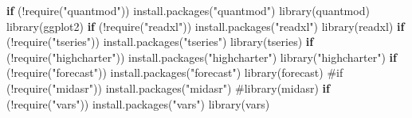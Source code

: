 \documentclass[
  polish,
  letterpaper,
  DIV=11,
  numbers=noendperiod]{scrartcl}
\newenvironment{Shaded}{\begin{snugshade}}{\end{snugshade}}
\newcommand{\CommentTok}[1]{\textcolor[rgb]{0.37,0.37,0.37}{#1}}
\newcommand{\ControlFlowTok}[1]{\textcolor[rgb]{0.00,0.23,0.31}{\textbf{#1}}}
\newcommand{\FunctionTok}[1]{\textcolor[rgb]{0.28,0.35,0.67}{#1}}
\newcommand{\NormalTok}[1]{\textcolor[rgb]{0.00,0.23,0.31}{#1}}
\newcommand{\SpecialCharTok}[1]{\textcolor[rgb]{0.37,0.37,0.37}{#1}}
\newcommand{\StringTok}[1]{\textcolor[rgb]{0.13,0.47,0.30}{#1}}
\begin{document}
\begin{Shaded}
\begin{Highlighting}[]
\ControlFlowTok{if}\NormalTok{ (}\SpecialCharTok{!}\FunctionTok{require}\NormalTok{(}\StringTok{"quantmod"}\NormalTok{)) }\FunctionTok{install.packages}\NormalTok{(}\StringTok{"quantmod"}\NormalTok{)}
\FunctionTok{library}\NormalTok{(quantmod)}
\FunctionTok{library}\NormalTok{(ggplot2)}
\ControlFlowTok{if}\NormalTok{ (}\SpecialCharTok{!}\FunctionTok{require}\NormalTok{(}\StringTok{"readxl"}\NormalTok{)) }\FunctionTok{install.packages}\NormalTok{(}\StringTok{"readxl"}\NormalTok{)}
\FunctionTok{library}\NormalTok{(readxl)}
\ControlFlowTok{if}\NormalTok{ (}\SpecialCharTok{!}\FunctionTok{require}\NormalTok{(}\StringTok{"tseries"}\NormalTok{)) }\FunctionTok{install.packages}\NormalTok{(}\StringTok{"tseries"}\NormalTok{)}
\FunctionTok{library}\NormalTok{(tseries)}
\ControlFlowTok{if}\NormalTok{ (}\SpecialCharTok{!}\FunctionTok{require}\NormalTok{(}\StringTok{"highcharter"}\NormalTok{)) }\FunctionTok{install.packages}\NormalTok{(}\StringTok{"highcharter"}\NormalTok{)}
\FunctionTok{library}\NormalTok{(}\StringTok{"highcharter"}\NormalTok{)}
\ControlFlowTok{if}\NormalTok{ (}\SpecialCharTok{!}\FunctionTok{require}\NormalTok{(}\StringTok{"forecast"}\NormalTok{)) }\FunctionTok{install.packages}\NormalTok{(}\StringTok{"forecast"}\NormalTok{)}
\FunctionTok{library}\NormalTok{(forecast)}
\CommentTok{\#if (!require("midasr")) install.packages("midasr")}
\CommentTok{\#library(midasr)}
\ControlFlowTok{if}\NormalTok{ (}\SpecialCharTok{!}\FunctionTok{require}\NormalTok{(}\StringTok{"vars"}\NormalTok{)) }\FunctionTok{install.packages}\NormalTok{(}\StringTok{"vars"}\NormalTok{)}
\FunctionTok{library}\NormalTok{(vars)}


\end{Highlighting}
\end{Shaded}
\end{document}

